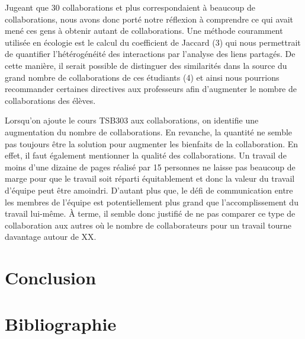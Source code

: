 \documentclass[9pt,twocolumn,twoside,]{pnas-new}
\begin{document}
Jugeant que 30 collaborations et plus correspondaient à beaucoup de
collaborations, nous avons donc porté notre réflexion à comprendre ce
qui avait mené ces gens à obtenir autant de collaborations. Une méthode
couramment utilisée en écologie est le calcul du coefficient de Jaccard
(3) qui nous permettrait de quantifier l'hétérogénéité des interactions
par l'analyse des liens partagés. De cette manière, il serait possible
de distinguer des similarités dans la source du grand nombre de
collaborations de ces étudiants (4) et ainsi nous pourrions recommander
certaines directives aux professeurs afin d'augmenter le nombre de
collaborations des élèves.

Lorsqu'on ajoute le cours TSB303 aux collaborations, on identifie une
augmentation du nombre de collaborations. En revanche, la quantité ne
semble pas toujours être la solution pour augmenter les bienfaits de la
collaboration. En effet, il faut également mentionner la qualité des
collaborations. Un travail de moins d'une dizaine de pages réalisé par
15 personnes ne laisse pas beaucoup de marge pour que le travail soit
réparti équitablement et donc la valeur du travail d'équipe peut être
amoindri. D'autant plus que, le défi de communication entre les membres
de l'équipe est potentiellement plus grand que l'accomplissement du
travail lui-même. À terme, il semble donc justifié de ne pas comparer ce
type de collaboration aux autres où le nombre de collaborateurs pour un
travail tourne davantage autour de XX.

\hypertarget{conclusion}{%
\section{Conclusion}\label{conclusion}}

\newpage

\hypertarget{bibliographie}{%
\section*{Bibliographie}\label{bibliographie}}
\end{document}
